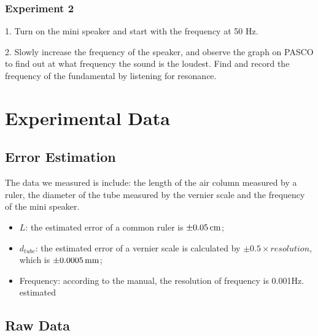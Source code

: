 \documentclass[12pt]{article}
\begin{document}
 	\subsubsection{Experiment 2}
 	1. Turn on the mini speaker and start with the frequency at 50 Hz. \par 
 	2. Slowly increase the frequency of the speaker, and observe the graph on PASCO to find out at what frequency the sound is the loudest. Find and record the frequency of the fundamental by listening for resonance.\par 
 	
 	\section{Experimental Data}
 	\subsection{Error Estimation}
 	The data we measured is include: the length of the air column measured by a ruler, the diameter of the tube measured by the vernier scale and the frequency of the mini speaker.
 	\begin{itemize}
 		\item $ L $: the estimated error of a common ruler is $\SI{\pm0.05}{\centi\meter}$;
 		\item $ d_{tube} $: the estimated error of a vernier scale is calculated by $ \pm0.5\times resolution $, which is $ \SI{\pm0.0005}{m\meter} $;
 		\item Frequency: according to the manual, the resolution of frequency is 0.001Hz.  estimated 
 	\end{itemize}
 	
 	\subsection{Raw Data}
\end{document}
